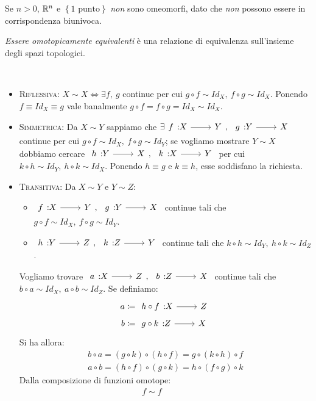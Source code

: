 \begin{attention}
	Se $n>0$, $\mathbb{R}^n$ e $\left\{1\text{ punto}\right\}$ \textit{non} sono omeomorfi, dato che \textit{non} possono essere in corrispondenza biunivoca.
\end{attention}
\begin{example}
	\textit{Essere omotopicamente equivalenti} è una relazione di equivalenza sull'insieme degli spazi topologici.
\end{example}
\begin{demonstration}~{}
	\begin{itemize}
	\item \textsc{Riflessiva}: $X\sim X\iff \exists f,\ g$ continue per cui $g\circ f\sim Id_X,\ f\circ g\sim Id_X$. Ponendo $f\equiv Id_X\equiv g$ vale banalmente $g\circ f=f\circ g=Id_X\sim Id_X$.
	\item \textsc{Simmetrica}: Da $X\sim Y$ sappiamo che $\exists \funz{f}{X}{Y},\ \funz{g}{Y}{X}$ continue per cui $g\circ f\sim Id_X,\ f\circ g\sim Id_Y$; se vogliamo mostrare $Y\sim X$ dobbiamo cercare $\funz{h}{Y}{X},\ \funz{k}{X}{Y}$ per cui $k\circ h\sim Id_Y,\ h\circ k\sim Id_X$. Ponendo $h\equiv g$ e $k\equiv h$, esse soddisfano la richiesta.
	\item \textsc{Transitiva}: Da $X\sim Y$ e $Y\sim Z$:
	\begin{itemize}
		\item $\funz{f}{X}{Y},\ \funz{g}{Y}{X}$ continue tali che $g\circ f\sim Id_X,\ f\circ g\sim Id_Y$.
			\item $\funz{h}{Y}{Z},\ \funz{k}{Z}{Y}$ continue tali che $k\circ h\sim Id_Y,\ h\circ k\sim Id_Z$.
	\end{itemize}
	Vogliamo trovare $\funz{a}{X}{Z},\ \funz{b}{Z}{X}$ continue tali che $b\circ a\sim Id_X,\ a\circ b\sim Id_Z$. Se definiamo:
	\begin{gather*}
		a\coloneqq \funz{h\circ f}{X}{Z}\\
		b\coloneqq \funz{g\circ k}{Z}{X}
	\end{gather*}
	Si ha allora:
	\begin{gather*}
		b\circ a=\left(g\circ k\right)\circ\left(h\circ f\right)=g\circ \left(k\circ h\right)\circ f\\
		a\circ b=\left(h\circ f\right)\circ \left(g\circ k\right)=h\circ\left(f\circ g\right)\circ k
	\end{gather*}
	Dalla composizione di funzioni omotope:
	\begin{equation*}
		\begin{array}{cccccc}
			f\sim f & & & &\\

\end{array}
\end{equation*}
\end{itemize}
\end{demonstration}
